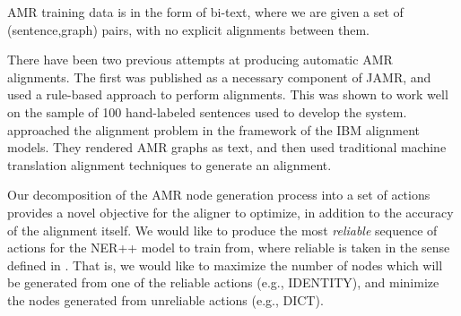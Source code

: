 
AMR training data is in the form of bi-text, where we are given a set of
  (sentence,graph) pairs, with no explicit alignments between them.



There have been two previous attempts at producing automatic AMR alignments. 
The first was published as a necessary component of JAMR, 
  and used a rule-based approach to perform alignments.
This was shown to work well on the sample of 100 hand-labeled sentences used to 
  develop the system.
 approached the alignment problem in 
  the framework of the IBM alignment models.
They rendered AMR graphs as text, and then used traditional machine translation 
  alignment techniques to generate an alignment.

Our decomposition of the AMR node generation process into a set of actions 
  provides a novel objective for the aligner to optimize, in addition to the
  accuracy of the alignment itself.
We would like to produce the most \textit{reliable}
  sequence of actions for the NER++ model to train from, where reliable is taken
  in the sense defined in .
That is, we would like to maximize the number of nodes which will be generated
  from one of the reliable actions (e.g., IDENTITY), and minimize the nodes
  generated from unreliable actions (e.g., DICT).

